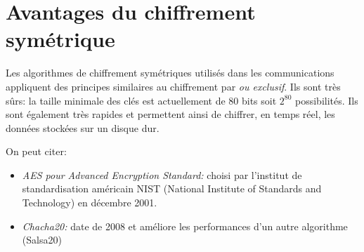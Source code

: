 \documentclass[a4paper,11pt]{article}
\begin{document}
\section{Avantages du chiffrement symétrique}
Les algorithmes de chiffrement symétriques utilisés dans les communications appliquent des principes similaires au chiffrement par \emph{ou exclusif}. Ils sont très sûrs: la taille minimale des clés est actuellement de 80 bits soit $2^{80}$ possibilités. Ils sont également très rapides et permettent ainsi de chiffrer, en temps réel, les données stockées sur un disque dur.

On peut citer:
\begin{itemize}
    \item \emph{AES pour Advanced Encryption Standard:} choisi par l'institut de standardisation américain NIST (National Institute of Standards and Technology) en décembre 2001.
    \item \emph{Chacha20:} date de 2008 et améliore les performances d'un autre algorithme (Salsa20)
\end{itemize}
\end{document}
